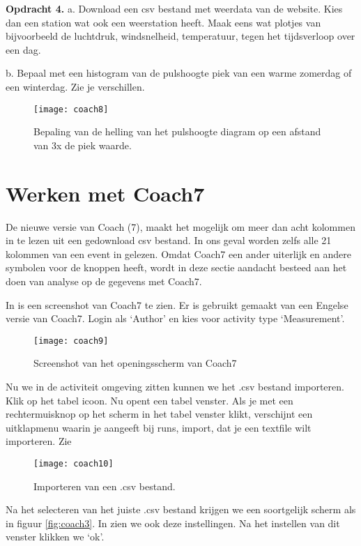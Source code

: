 \textbf{Opdracht 4.}
a.
Download een csv bestand met weerdata van de \hisparc website.
Kies dan een \hisparc station wat ook een weerstation heeft.
Maak eens wat plotjes van bijvoorbeeld de luchtdruk, windsnelheid, temperatuur,
tegen het tijdsverloop over een dag.

b. Bepaal met een histogram van de pulshoogte piek van een warme zomerdag of 
een winterdag. Zie je verschillen. 

\begin{figure}
    \centering
    \texttt{[image: coach8]}
    \caption{Bepaling van de helling van het pulshoogte diagram op een afstand
    van 3x de piek waarde.}
    \label{fig:coach8}
\end{figure}

\section{Werken met Coach7}

De nieuwe versie van Coach (7), maakt het mogelijk om meer dan acht kolommen in te lezen
uit een gedownload csv bestand. In ons geval worden zelfs alle 21 kolommen van een event in gelezen.
Omdat Coach7 een ander uiterlijk en andere symbolen voor de knoppen heeft, wordt 
in deze sectie aandacht besteed aan het doen van analyse op de gegevens met Coach7.

In  is een screenshot van Coach7 te zien. Er is gebruikt gemaakt van een Engelse versie van 
Coach7. Login als `Author' en kies voor activity type `Measurement'.

\begin{figure}
    \centering
    \texttt{[image: coach9]}
    \caption{Screenshot van het openingsscherm van Coach7}
    \label{fig:coach9}
\end{figure}

Nu we in de activiteit omgeving zitten kunnen we het .csv bestand importeren.
Klik op het tabel icoon. Nu opent een tabel venster.
Als je met een rechtermuisknop op het scherm in het tabel venster klikt, verschijnt 
een uitklapmenu waarin je aangeeft bij runs, import, dat je een textfile wilt importeren. 
Zie 

\begin{figure}
    \centering
    \texttt{[image: coach10]}
    \caption{Importeren van een .csv bestand.}
    \label{fig:coach10}
\end{figure}

Na het selecteren van het juiste .csv bestand krijgen we een soortgelijk scherm
als in figuur \ref{fig:coach3}. In  zien we ook deze instellingen.
Na het instellen van dit venster klikken we `ok'.

